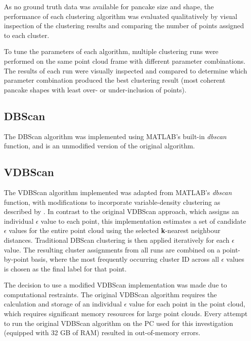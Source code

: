 As no ground truth data was available for pancake size and shape, the performance of each clustering algorithm was evaluated qualitatively by visual inspection of the clustering results and comparing the number of points assigned to each cluster.

To tune the parameters of each algorithm, multiple clustering runs were performed on the same point cloud frame with different parameter combinations. The results of each run were visually inspected and compared to determine which parameter combination produced the best clustering result (most coherent pancake shapes with least over- or under-inclusion of points).

\subsection{DBScan}
\label{subsec:ch6.section5.subsec1}

The \ac{DBScan} algorithm was implemented using MATLAB's built-in \emph{dbscan} function, and is an unmodified version of the original algorithm.

\subsection{VDBScan}
\label{subsec:ch6.section5.subsec2}

The \ac{VDBScan} algorithm implemented was adapted from MATLAB’s \emph{dbscan} function, with modifications to incorporate variable-density clustering as described by \cite{liuVDBSCANVariedDensity2007}. In contrast to the original \ac{VDBScan} approach, which assigns an individual \textbf{$\epsilon$} value to each point, this implementation estimates a set of candidate \textbf{$\epsilon$} values for the entire point cloud using the selected \textbf{k}-nearest neighbour distances. Traditional \ac{DBScan} clustering is then applied iteratively for each \textbf{$\epsilon$} value. The resulting cluster assignments from all runs are combined on a point-by-point basis, where the most frequently occurring cluster ID across all \textbf{$\epsilon$} values is chosen as the final label for that point.

The decision to use a modified \ac{VDBScan} implementation was made due to computational restraints. The original \ac{VDBScan} algorithm requires the calculation and storage of an individual \textbf{$\epsilon$} value for each point in the point cloud, which requires significant memory resources for large point clouds. Every attempt to run the original \ac{VDBScan} algorithm on the PC used for this investigation (equipped with 32 GB of RAM) resulted in out-of-memory errors. 

